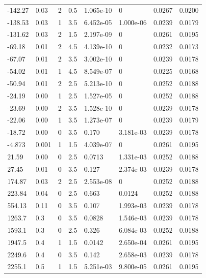 \documentclass[preview]{standalone}
\begin{document}
{{\begin{tabular}{L{1.2cm}C{1.2cm} C{0.3cm}C{0.5cm} C{1.4cm}C{1.4cm} C{1.4cm}C{1.4cm}}
  -142.27  &  0.03  & 2     & 0.5 &  1.065e-10  & 0  & 0.0267 &  0.0200   \\ 
  -138.53  &  0.03  & 1     & 3.5 &  6.452e-05  & 1.000e-06  & 0.0239 &  0.0179   \\ 
  -131.62  &  0.03  & 2     & 1.5 &  2.197e-09  & 0  & 0.0261 &  0.0195   \\ 
  -69.18  &  0.01  & 2     & 4.5 &  4.139e-10  & 0  & 0.0232 &  0.0173   \\ 
  -67.07  &  0.01  & 2     & 3.5 &  3.002e-10  & 0  & 0.0239 &  0.0178   \\ 
  -54.02  &  0.01  & 1     & 4.5 &  8.549e-07  & 0  & 0.0225 &  0.0168   \\ 
  -50.94  &  0.01  & 2     & 2.5 &  5.213e-10  & 0  & 0.0252 &  0.0188   \\ 
  -24.19  &  0.00  & 1     & 2.5 &  1.527e-05  & 0  & 0.0252 &  0.0188   \\ 
  -23.69  &  0.00  & 2     & 3.5 &  1.528e-10  & 0  & 0.0239 &  0.0178   \\ 
  -22.06  &  0.00  & 1     & 3.5 &  1.273e-07  & 0  & 0.0239 &  0.0179   \\ 
  -18.72  &  0.00  & 0     & 3.5 &  0.170  & 3.181e-03  & 0.0239 &  0.0178   \\ 
  -4.873  &  0.001  & 1     & 1.5 &  4.039e-07  & 0  & 0.0261 &  0.0195   \\ 
  21.59  &  0.00  & 0     & 2.5 &  0.0713  & 1.331e-03  & 0.0252 &  0.0188   \\ 
  27.45  &  0.01  & 0     & 3.5 &  0.127  & 2.374e-03  & 0.0239 &  0.0178   \\ 
  174.87  &  0.03  & 2     & 2.5 &  2.553e-08  & 0  & 0.0252 &  0.0188   \\ 
  223.84  &  0.04  & 0     & 2.5 &  0.663  & 0.0124  & 0.0252 &  0.0188   \\ 
  554.13  &  0.11  & 0     & 3.5 &  0.107  & 1.993e-03  & 0.0239 &  0.0178   \\ 
  1263.7  &   0.3  & 0     & 3.5 &  0.0828  & 1.546e-03  & 0.0239 &  0.0178   \\ 
  1593.1  &   0.3  & 0     & 2.5 &  0.326  & 6.084e-03  & 0.0252 &  0.0188   \\ 
  1947.5  &   0.4  & 1     & 1.5 &  0.0142  & 2.650e-04  & 0.0261 &  0.0195   \\ 
  2249.6  &   0.4  & 0     & 3.5 &  0.142  & 2.658e-03  & 0.0239 &  0.0178   \\ 
  2255.1  &   0.5  & 1     & 1.5 &  5.251e-03  & 9.800e-05  & 0.0261 &  0.0195   \\ 

\end{tabular}}}
\end{document}
